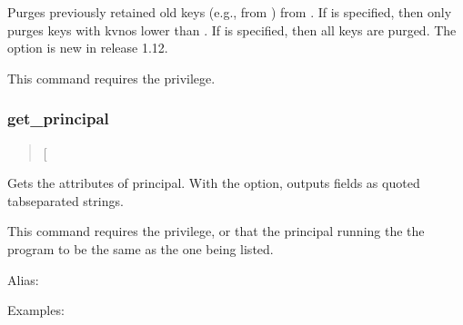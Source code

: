 \documentclass[letterpaper,10pt,english]{sphinxmanual}
\begin{document}
\sphinxAtStartPar
Purges previously retained old keys (e.g., from ) from .  If  is specified, then
only purges keys with kvnos lower than .  If
 is specified, then all keys are purged.  The  option
is new in release 1.12.

\sphinxAtStartPar
This command requires the  privilege.


\subsubsection{get\_principal}
\label{\detokenize{admin/admin_commands/kadmin_local:get-principal}}\label{\detokenize{admin/admin_commands/kadmin_local:id8}}\begin{quote}

\sphinxAtStartPar
{} {[}\sphinxstylestrong{\sphinxhyphen{}terse}{]} 
\end{quote}

\sphinxAtStartPar
Gets the attributes of principal.  With the  option, outputs
fields as quoted tab\sphinxhyphen{}separated strings.

\sphinxAtStartPar
This command requires the  privilege, or that the principal
running the the program to be the same as the one being listed.

\sphinxAtStartPar
Alias: 

\sphinxAtStartPar
Examples:
\end{document}
